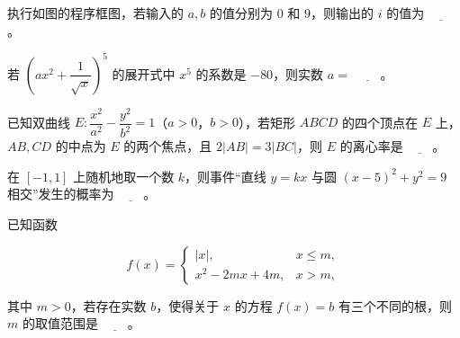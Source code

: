 \Needspace{0.4\textheight}
\begin{question}
执行如图的程序框图，若输入的 \(a,b\) 的值分别为 \(0\) 和 \(9\)，则输出的 \(i\) 的值为 \(\underline{\qquad}\)。
\nopagebreak[4]
\begin{center}\end{center}
\nopagebreak[4]
\end{question}
\begin{question}
若 \(\left(ax^{2}+\dfrac{1}{\sqrt{x}}\right)^{5}\) 的展开式中 \(x^{5}\) 的系数是 \(-80\)，则实数 \(a=\) \(\underline{\qquad}\)。

\end{question}
\begin{question}
已知双曲线 \(E:\dfrac{x^{2}}{a^{2}}-\dfrac{y^{2}}{b^{2}}=1\)（\(a>0\)，\(b>0\)），若矩形 \(ABCD\) 的四个顶点在 \(E\) 上，\(AB,CD\) 的中点为 \(E\) 的两个焦点，且 \(2|AB|=3|BC|\)，则 \(E\) 的离心率是 \(\underline{\qquad}\)。

\end{question}
\begin{question}
在 \([-1,1]\) 上随机地取一个数 \(k\)，则事件“直线 \(y=kx\) 与圆 \((x-5)^{2}+y^{2}=9\) 相交”发生的概率为 \(\underline{\qquad}\)。

\end{question}
\begin{question}
已知函数

\nopagebreak[4]
\[
f(x)=\begin{cases}|x|, & x\leqslant m,\\x^{2}-2mx+4m, & x>m,\end{cases}
\]

其中 \(m>0\)，若存在实数 \(b\)，使得关于 \(x\) 的方程 \(f(x)=b\) 有三个不同的根，则 \(m\) 的取值范围是 \(\underline{\qquad}\)。

\end{question}

